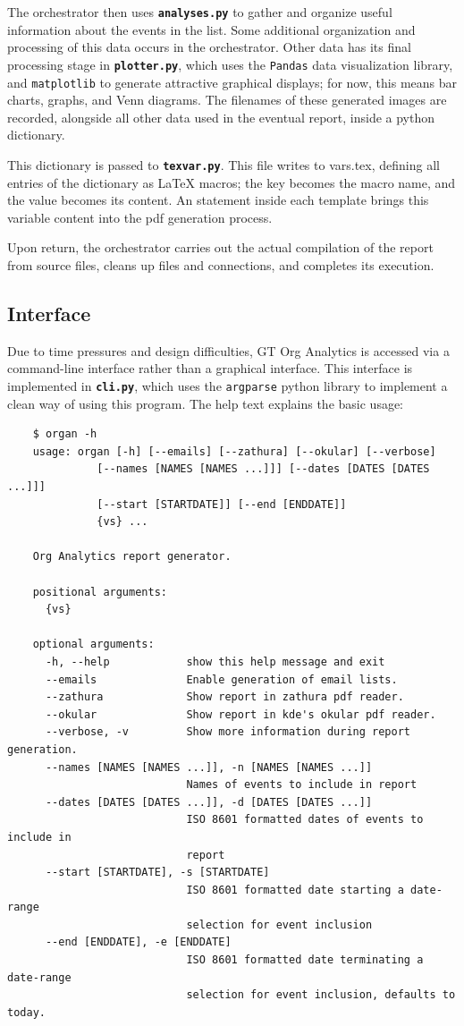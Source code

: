 \documentclass[12pt]{article}
\begin{document}
The orchestrator then uses \texttt{\textbf{analyses.py}} to gather and organize useful information about the events in the list.
Some additional organization and processing of this data occurs in the orchestrator.
Other data has its final processing stage in \texttt{\textbf{plotter.py}}, which uses the \texttt{Pandas} data visualization library, and \texttt{matplotlib} to generate attractive graphical displays; for now, this means bar charts, graphs, and Venn diagrams.
The filenames of these generated images are recorded, alongside all other data used in the eventual report, inside a python dictionary.

This dictionary is passed to \texttt{\textbf{texvar.py}}.
This file writes to vars.tex, defining all entries of the dictionary as LaTeX macros; the key becomes the macro name, and the value becomes its content.
An \verb'' statement inside each template brings this variable content into the pdf generation process.

Upon return, the orchestrator carries out the actual compilation of the report from source files, cleans up files and connections, and completes its execution.

\subsection*{Interface}
Due to time pressures and design difficulties, GT Org Analytics is accessed via a command-line interface rather than a graphical interface.
This interface is implemented in \texttt{\textbf{cli.py}}, which uses the \texttt{argparse} python library to implement a clean way of using this program.
The help text explains the basic usage:

\begin{verbatim}
    $ organ -h
    usage: organ [-h] [--emails] [--zathura] [--okular] [--verbose]
              [--names [NAMES [NAMES ...]]] [--dates [DATES [DATES ...]]]
              [--start [STARTDATE]] [--end [ENDDATE]]
              {vs} ...

    Org Analytics report generator.

    positional arguments:
      {vs}

    optional arguments:
      -h, --help            show this help message and exit
      --emails              Enable generation of email lists.
      --zathura             Show report in zathura pdf reader.
      --okular              Show report in kde's okular pdf reader.
      --verbose, -v         Show more information during report generation.
      --names [NAMES [NAMES ...]], -n [NAMES [NAMES ...]]
                            Names of events to include in report
      --dates [DATES [DATES ...]], -d [DATES [DATES ...]]
                            ISO 8601 formatted dates of events to include in
                            report
      --start [STARTDATE], -s [STARTDATE]
                            ISO 8601 formatted date starting a date-range
                            selection for event inclusion
      --end [ENDDATE], -e [ENDDATE]
                            ISO 8601 formatted date terminating a date-range
                            selection for event inclusion, defaults to today.
\end{verbatim}
\end{document}
